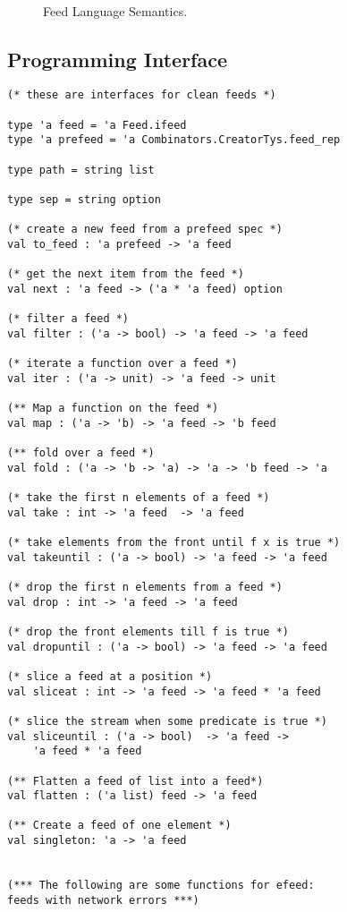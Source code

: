 \begin{figure*}[t]
\[\begin{array}{lcl}
\end{array}
\]
\caption{Feed Language Semantics.}
\label{fig:semantics}
\end{figure*}

\subsection{Programming Interface}
{\small 
\begin{verbatim}
(* these are interfaces for clean feeds *)

type 'a feed = 'a Feed.ifeed
type 'a prefeed = 'a Combinators.CreatorTys.feed_rep

type path = string list

type sep = string option

(* create a new feed from a prefeed spec *)
val to_feed : 'a prefeed -> 'a feed

(* get the next item from the feed *)
val next : 'a feed -> ('a * 'a feed) option

(* filter a feed *)
val filter : ('a -> bool) -> 'a feed -> 'a feed

(* iterate a function over a feed *)
val iter : ('a -> unit) -> 'a feed -> unit

(** Map a function on the feed *)
val map : ('a -> 'b) -> 'a feed -> 'b feed

(** fold over a feed *)
val fold : ('a -> 'b -> 'a) -> 'a -> 'b feed -> 'a

(* take the first n elements of a feed *)
val take : int -> 'a feed  -> 'a feed

(* take elements from the front until f x is true *)
val takeuntil : ('a -> bool) -> 'a feed -> 'a feed

(* drop the first n elements from a feed *)
val drop : int -> 'a feed -> 'a feed

(* drop the front elements till f is true *)
val dropuntil : ('a -> bool) -> 'a feed -> 'a feed 

(* slice a feed at a position *)
val sliceat : int -> 'a feed -> 'a feed * 'a feed

(* slice the stream when some predicate is true *)
val sliceuntil : ('a -> bool)  -> 'a feed -> 
	'a feed * 'a feed

(** Flatten a feed of list into a feed*)
val flatten : ('a list) feed -> 'a feed

(** Create a feed of one element *)
val singleton: 'a -> 'a feed


(*** The following are some functions for efeed: 
feeds with network errors ***)


\end{verbatim}}
